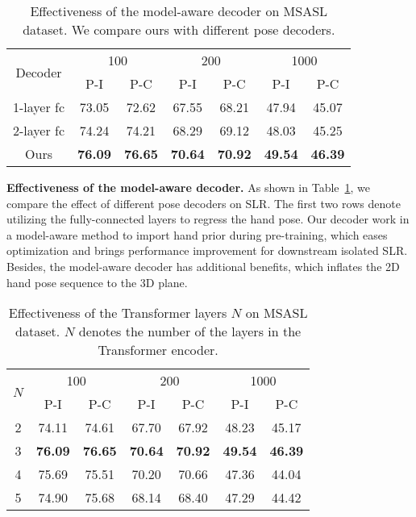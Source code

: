 \documentclass[10pt,twocolumn,letterpaper]{article}
\begin{document}
\begin{table}[t]
\small
\tabcolsep=4pt
\begin{center}
\begin{tabular}{c|cc|cc|cc}
\hline
\multicolumn{1}{c|}{\multirow{2}{*}{Decoder}} & \multicolumn{2}{c|}{100} & \multicolumn{2}{c|}{200} & \multicolumn{2}{c}{1000} \\
           & P-I & P-C & P-I   & P-C   & P-I   & P-C   \\ \hline \hline
1-layer fc & 73.05 & 72.62 & 67.55 & 68.21 & 47.94 & 45.07  \\
2-layer fc & 74.24 & 74.21 & 68.29 & 69.12 & 48.03 & 45.25   \\
Ours       & \textbf{76.09} & \textbf{76.65} & \textbf{70.64} & \textbf{70.92} & \textbf{49.54} & \textbf{46.39} \\ \hline   
\end{tabular}
\end{center}
\caption{Effectiveness of the model-aware decoder on MSASL dataset. We compare ours with different pose decoders.}
\label{model-aware}
\vspace{-0.2cm}
\end{table}




\noindent \textbf{Effectiveness of the model-aware decoder.}
As shown in Table~\ref{model-aware}, we compare the effect of different pose decoders on SLR.
The first two rows denote utilizing the fully-connected layers to regress the hand pose.
Our decoder work in a model-aware method to import hand prior during pre-training, which eases optimization and brings performance improvement for downstream isolated SLR.
Besides, the model-aware decoder has additional benefits, which inflates the 2D hand pose sequence to the 3D plane.


\begin{table}[t]
\small
\tabcolsep=6pt
\begin{center}
\begin{tabular}{c|cc|cc|cc}
\hline
\multicolumn{1}{c|}{\multirow{2}{*}{$N$}} & \multicolumn{2}{c|}{100} & \multicolumn{2}{c|}{200} & \multicolumn{2}{c}{1000} \\
      & P-I & P-C & P-I & P-C & P-I & P-C   \\ \hline \hline
2 & 74.11 & 74.61  & 67.70 & 67.92 & 48.23 & 45.17   \\
3 & \textbf{76.09} & \textbf{76.65} & \textbf{70.64} & \textbf{70.92} & \textbf{49.54} & \textbf{46.39} \\  
4 & 75.69 & 75.51 & 70.20 & 70.66 & 47.36 & 44.04  \\
5 & 74.90 & 75.68 & 68.14 & 68.40 & 47.29 & 44.42  \\ \hline  
\end{tabular}
\end{center}
\caption{Effectiveness of the Transformer layers $N$ on MSASL dataset. $N$ denotes the number of the layers in the Transformer encoder.}
\label{layer}
\vspace{-0.3cm}
\end{table}
\end{document}
